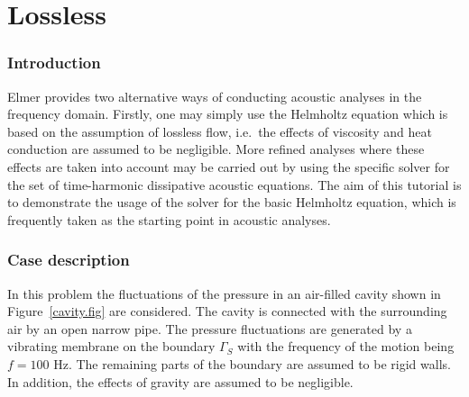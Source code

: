 \chapter{Lossless }



\subsection*{Introduction}

Elmer provides two alternative ways of conducting acoustic analyses in the
frequency domain. Firstly, one may simply use the Helmholtz equation which 
is based on the assumption of lossless flow, i.e.\ the effects of viscosity 
and heat conduction are assumed to be negligible. More refined analyses where 
these effects are taken into account may be carried out by using the specific 
solver for the set of time-harmonic dissipative acoustic equations. 
The aim of this tutorial is to demonstrate the usage of the solver
for the basic Helmholtz equation, which is frequently taken as the starting
point in acoustic analyses. 

\subsection*{Case description}

In this problem the fluctuations of the pressure in an air-filled
cavity shown in Figure~\ref{cavity.fig} are considered. The cavity is 
connected with the surrounding air by an open narrow pipe. The pressure 
fluctuations are generated by a vibrating membrane on the boundary $\Gamma_S$ 
with the frequency of the motion being $f=100$ Hz. 
The remaining parts of the boundary are assumed to be rigid walls. 
In addition, the effects of gravity are assumed to be negligible.


